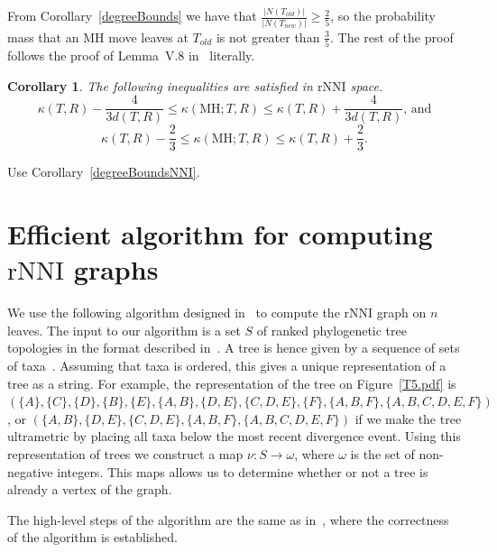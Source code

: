 \documentclass{amsart}
\newtheorem{corollary}[lemma]{Corollary}
\newcommand{\rnni}{\mathrm{rNNI}}
\newcommand{\MH}{\mathrm{MH}}
\begin{document}
\proof
From Corollary~\ref{degreeBounds} we have that $\frac{|N(T_{old})|}{|N(T_{new})|} \geq \frac{2}{5}$, so the probability mass that an MH move leaves at $T_{old}$ is not greater than $\frac35$.
The rest of the proof follows the proof of Lemma~V.8 in~\cite{Whidden2015-es} literally.
\endproof

\begin{corollary}
The following inequalities are satisfied in $\rnni$  space.
\[
\kappa(T,R) - \dfrac{4}{3d(T,R)} \leq \kappa(\MH;T,R) \leq \kappa(T,R) +
\dfrac{4}{3d(T,R)}\mbox{, and}
\]
\[
\kappa(T,R) - \dfrac23 \leq \kappa(\MH;T,R) \leq \kappa(T,R) + \dfrac23.
\]
\end{corollary}

\proof
Use Corollary~\ref{degreeBoundsNNI}.
\endproof

\section{Efficient algorithm for computing $\rnni$ graphs}

We use the following algorithm designed in~\cite{Whidden2015-es} to compute the $\rnni$ graph on $n$ leaves.
The input to our algorithm is a set $S$ of ranked phylogenetic tree topologies in the format described in~\cite{Semple2003-nj,Gavryushkin2014-bw}.
A tree is hence given by a sequence of sets of taxa~\cite{Gavryushkin2014-bw}.
Assuming that taxa is ordered, this gives a unique representation of a tree as a string.
For example, the representation of the tree on Figure~\ref{T5.pdf} is $(\{A\}, \{C\}, \{D\}, \{B\}, \{E\}, \{A,B\}, \{D,E\}, \{C, D, E\}, \{F\}, \{A,B,F\}, \{A,B,C,D,E,F\})$, or
$(\{A,B\}, \{D,E\}, \{C, D, E\}, \{A,B,F\}, \{A,B,C,D,E,F\})$ if we make the tree ultrametric by placing all taxa below the most recent divergence event.
Using this representation of trees we construct a map $\nu : S \to \omega$, where $\omega$ is the set of non-negative integers.
This maps allows us to determine whether or not a tree is already a vertex of the graph.

The high-level steps of the algorithm are the same as in~\cite{Whidden2015-es}, where the correctness of the algorithm is established.
\end{document}
